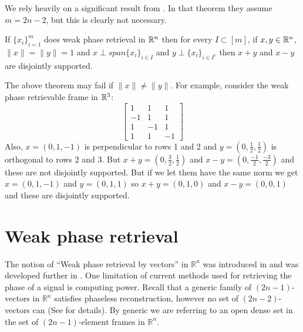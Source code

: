 We rely heavily on a significant result from \cite{CAR2021}. In that theorem they assume $m=2n-2$, but this is clearly not necessary.
\begin{theorem}\label{T52}
If $\{x_i\}_{i=1}^{m}$ does weak phase retrieval in $\mathbb R^n$ then for every $I\subset [m]$,
if $x,y\in \mathbb R^n$, $\|x\|=\|y\|=1$ and $x\perp span\{x_i\}_{i\in I}$ and $y\perp \{x_i\}_{i\in I^c}$ then 
$x+y$ and $x-y$ are disjointly supported.
\end{theorem}
\begin{remark}\label{s18}
The above theorem may fail if $\|x\| \ne \|y\|$. For example, consider the weak phase retrievable frame in $\mathbb R^3$:
\[ \begin{bmatrix}
 1&1&1\\
 -1&1&1\\
 1&-1&1\\
 1&1&-1
 \end{bmatrix}\]
Also, $x=(0,1,-1)$ is perpendicular to rows 1 and 2 and $y=(0,\frac{1}{2},\frac{1}{2})$ is orthogonal to rows 2 and 3.
But $x+y=(0,\frac{3}{2},\frac{1}{2})$ and $x-y=(0,\frac{-1}{2},\frac{-3}{2})$ and these are not disjointly supported.
But if we let them have the same norm we get $x=(0,1,-1)$ and $y=(0,1,1)$ so $x+y=(0,1,0)$ and $x-y=(0,0,1)$ and these are
disjointly supported.
\end{remark}





\section{Weak phase retrieval}\label{s:Weak phase retrieval by vectors and projections }
The notion of ``Weak phase retrieval by vectors'' in $\mathbb{R}^n$ was introduced in \cite{ACNT2015} and was
developed further in \cite{ACGJT2016}. One limitation of current methods used for retrieving
the phase of a signal is computing power. Recall that a generic family of $(2n-1)$-
vectors in $\mathbb{R}^n$ satisfies phaseless reconstruction, however no set of $(2n-2)$-vectors
can (See \cite{ACGJT2016} for details). By generic we are referring to an open dense set in the set
of $(2n-1)$-element frames in $\mathbb{R}^n$. 

